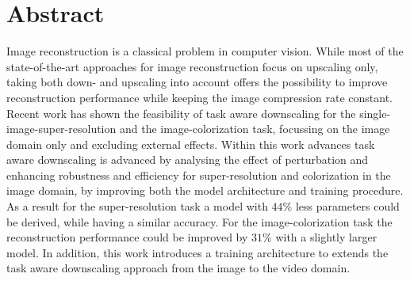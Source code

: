 \newpage
\section*{Abstract}
\noindent Image reconstruction is a classical problem in computer vision.
While most of the state-of-the-art approaches for image reconstruction
focus on upscaling only, taking both down- and upscaling into account
offers the possibility to improve reconstruction performance while keeping the
image compression rate constant. Recent work has shown the feasibility of task
aware downscaling for the single-image-super-resolution and the image-colorization
task, focussing on the image domain only and excluding external effects.
\newline
Within this work advances task aware downscaling is advanced by analysing the
effect of perturbation and enhancing robustness and efficiency for super-resolution
and colorization in the image domain, by improving both the model architecture and
training procedure. As a result for the super-resolution task a model with $44 \%$
less parameters could be derived, while having a similar accuracy. For the
image-colorization task the reconstruction performance could be improved by
$31 \%$ with a slightly larger model. In addition, this work introduces a
training architecture to extends the task aware downscaling approach from the
image to the video domain.



